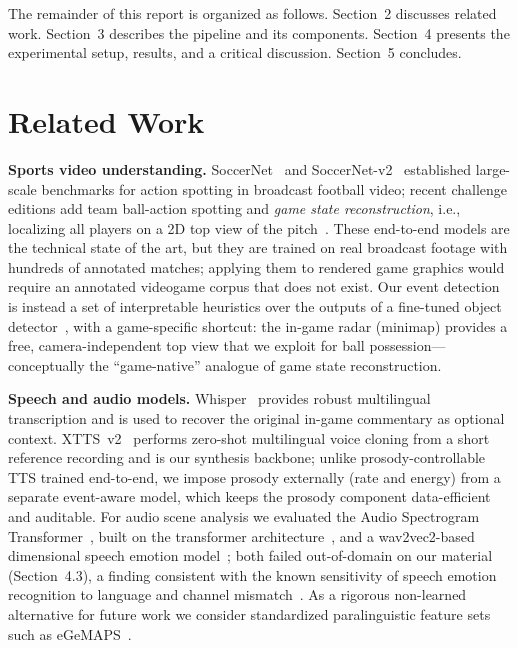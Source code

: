 \documentclass[10pt,twocolumn,a4paper]{article}
\begin{document}
	The remainder of this report is organized as follows. Section~2 discusses related work. Section~3 describes the pipeline and its components. Section~4 presents the experimental setup, results, and a critical discussion. Section~5 concludes.

	\section{Related Work}

	\textbf{Sports video understanding.} SoccerNet~\cite{giancola2018soccernet} and SoccerNet-v2~\cite{deliege2021soccernetv2} established large-scale benchmarks for action spotting in broadcast football video; recent challenge editions add team ball-action spotting and \emph{game state reconstruction}, i.e., localizing all players on a 2D top view of the pitch~\cite{cioppa2025soccernet}. These end-to-end models are the technical state of the art, but they are trained on real broadcast footage with hundreds of annotated matches; applying them to rendered game graphics would require an annotated videogame corpus that does not exist. Our event detection is instead a set of interpretable heuristics over the outputs of a fine-tuned object detector~\cite{jocher2023ultralytics}, with a game-specific shortcut: the in-game radar (minimap) provides a free, camera-independent top view that we exploit for ball possession---conceptually the ``game-native'' analogue of game state reconstruction.

	\textbf{Speech and audio models.} Whisper~\cite{radford2023whisper} provides robust multilingual transcription and is used to recover the original in-game commentary as optional context. XTTS~v2~\cite{casanova2024xtts} performs zero-shot multilingual voice cloning from a short reference recording and is our synthesis backbone; unlike prosody-controllable TTS trained end-to-end, we impose prosody externally (rate and energy) from a separate event-aware model, which keeps the prosody component data-efficient and auditable. For audio scene analysis we evaluated the Audio Spectrogram Transformer~\cite{gong2021ast}, built on the transformer architecture~\cite{vaswani2017attention}, and a wav2vec2-based dimensional speech emotion model~\cite{wagner2023dawn}; both failed out-of-domain on our material (Section~4.3), a finding consistent with the known sensitivity of speech emotion recognition to language and channel mismatch~\cite{wagner2023dawn}. As a rigorous non-learned alternative for future work we consider standardized paralinguistic feature sets such as eGeMAPS~\cite{eyben2016gemaps}.
\end{document}
